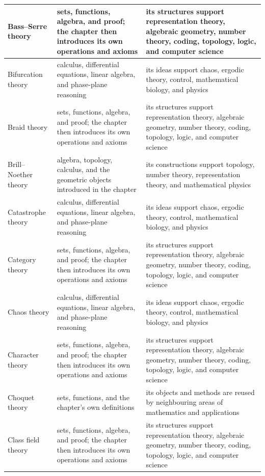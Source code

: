 \documentclass[11pt,oneside]{book}
\begin{document}
\begin{longtable}{>{\raggedright\arraybackslash}p{}>{\raggedright\arraybackslash}p{}>{\raggedright\arraybackslash}p{}}
\hline
Bass--Serre theory & sets, functions, algebra, and proof; the chapter then introduces its own operations and axioms & its structures support representation theory, algebraic geometry, number theory, coding, topology, logic, and computer science\\
\hline
Bifurcation theory & calculus, differential equations, linear algebra, and phase-plane reasoning & its ideas support chaos, ergodic theory, control, mathematical biology, and physics\\
\hline
Braid theory & sets, functions, algebra, and proof; the chapter then introduces its own operations and axioms & its structures support representation theory, algebraic geometry, number theory, coding, topology, logic, and computer science\\
\hline
Brill--Noether theory & algebra, topology, calculus, and the geometric objects introduced in the chapter & its constructions support topology, number theory, representation theory, and mathematical physics\\
\hline
Catastrophe theory & calculus, differential equations, linear algebra, and phase-plane reasoning & its ideas support chaos, ergodic theory, control, mathematical biology, and physics\\
\hline
Category theory & sets, functions, algebra, and proof; the chapter then introduces its own operations and axioms & its structures support representation theory, algebraic geometry, number theory, coding, topology, logic, and computer science\\
\hline
Chaos theory & calculus, differential equations, linear algebra, and phase-plane reasoning & its ideas support chaos, ergodic theory, control, mathematical biology, and physics\\
\hline
Character theory & sets, functions, algebra, and proof; the chapter then introduces its own operations and axioms & its structures support representation theory, algebraic geometry, number theory, coding, topology, logic, and computer science\\
\hline
Choquet theory & sets, functions, and the chapter's own definitions & its objects and methods are reused by neighbouring areas of mathematics and applications\\
\hline
Class field theory & sets, functions, algebra, and proof; the chapter then introduces its own operations and axioms & its structures support representation theory, algebraic geometry, number theory, coding, topology, logic, and computer science\\

\end{longtable}
\end{document}
